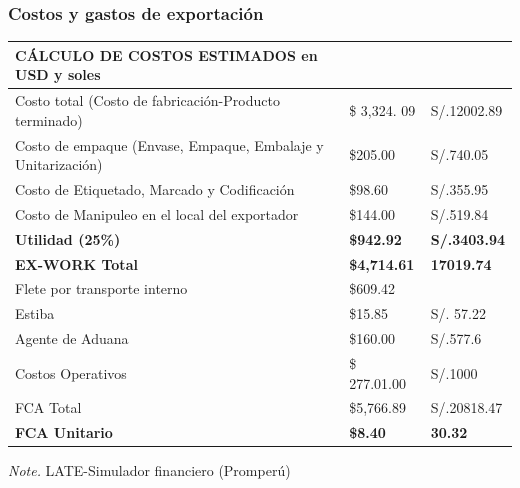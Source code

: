 \documentclass[
  stu,
  floatsintext,
  longtable,
  a4paper,
  nolmodern,
  notxfonts,
  notimes,
  colorlinks=true,linkcolor=blue,citecolor=blue,urlcolor=blue]{apa7}
\begin{document}
\subsubsection{Costos y gastos de
exportación}\label{costos-y-gastos-de-exportaciuxf3n}

\begin{table}

{\caption{{Cálculo de costos estimados y precio FCA en
USD}{\label{tbl-mytable2}}}}

\begin{longtable}[]{@{}
  >{\raggedright\arraybackslash}p{}
  >{\raggedright\arraybackslash}p{}
  >{\raggedright\arraybackslash}p{}@{}}
\toprule\noalign{}
\begin{minipage}[b]{\linewidth}\raggedright
CÁLCULO DE COSTOS ESTIMADOS en USD y soles
\end{minipage} & \begin{minipage}[b]{\linewidth}\raggedright
\end{minipage} & \begin{minipage}[b]{\linewidth}\raggedright
\end{minipage} \\
\midrule\noalign{}
\endhead
\bottomrule\noalign{}
\endlastfoot
Costo total (Costo de fabricación-Producto terminado) & \$ 3,324. 09 &
S/.12002.89 \\
Costo de empaque (Envase, Empaque, Embalaje y Unitarización) & \$205.00
& S/.740.05 \\
Costo de Etiquetado, Marcado y Codificación & \$98.60 & S/.355.95 \\
Costo de Manipuleo en el local del exportador & \$144.00 & S/.519.84 \\
\textbf{Utilidad (25\%)} & \textbf{\$942.92} & \textbf{S/.3403.94} \\
\textbf{EX-WORK Total} & \textbf{\$4,714.61} & \textbf{17019.74} \\
Flete por transporte interno & \$609.42 & 250.61 \\
Estiba & \$15.85 & S/. 57.22 \\
Agente de Aduana & \$160.00 & S/.577.6 \\
Costos Operativos & \$ 277.01.00 & S/.1000 \\
FCA Total & \$5,766.89 & S/.20818.47 \\
\textbf{FCA Unitario} & \textbf{\$8.40} & \textbf{30.32} \\
\end{longtable}

{\noindent \emph{Note.} LATE-Simulador financiero (Promperú)}

\end{table}
\end{document}

